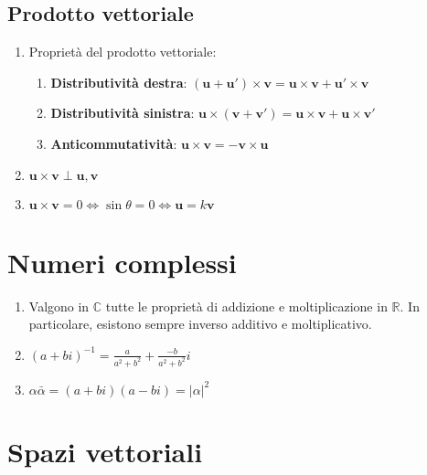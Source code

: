 \documentclass[draft]{article}
\newcommand{\bl}[1]{\mathbf{#1}}
\newcommand{\vu}{\mathbf{u}}
\newcommand{\vv}{\mathbf{v}}
\begin{document}
\subsection{Prodotto vettoriale}
\begin{enumerate}

\item Proprietà del prodotto vettoriale:
\begin{enumerate}
\item \textbf{Distributività destra}: $(\vu + \bl{u'}) \times \vv = \vu \times \vv + \bl{u'} \times \vv $ 
\item \textbf{Distributività sinistra}: $\vu \times (\vv + \bl{v'}) = \vu \times \vv + \vu \times \bl{v'} $
\item \textbf{Anticommutatività}: $\vu \times \vv = - \vv \times \vu $
\end{enumerate}

\item $\vu \times \vv \perp \vu,\vv$

\item $\vu \times \vv = 0 \Leftrightarrow \sin \theta = 0 \Leftrightarrow \vu=k \vv$

\end{enumerate}

\section{Numeri complessi}
\begin{enumerate}

\item Valgono in $\mathbb{C}$ tutte le proprietà di addizione e moltiplicazione in $\mathbb{R}$. In particolare, esistono sempre inverso additivo e moltiplicativo.

\item $(a + bi)^{-1} = \frac{a}{a^2 + b^2}+\frac{-b}{a^2 + b^2}i$

\item $\alpha \bar{\alpha} = (a+bi)(a-bi) = |\alpha |^2$

\end{enumerate}

\section{Spazi vettoriali}
\end{document}
